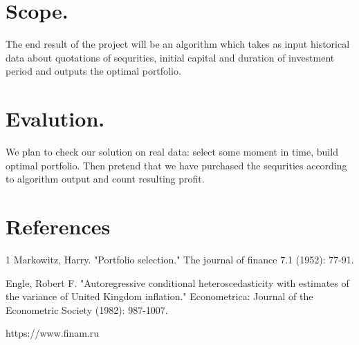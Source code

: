 \documentclass[a4paper, 12pt]{article}
\begin{document}
\section{Scope.}

The end result of the project will be an algorithm which takes as input historical data about 
quotations of sequrities, initial capital and duration of investment period and outputs the optimal portfolio.


\section{Evalution.}

We plan to check our solution on real data: select some moment in time, build optimal portfolio. Then pretend that we have
purchased the sequrities according to algorithm output and count resulting profit.


\section{References}
\def\refname{}
\begin{thebibliography}
{1} Markowitz, Harry. "Portfolio selection." The journal of finance 7.1 (1952): 77-91.


Engle, Robert F. "Autoregressive conditional heteroscedasticity with estimates of the variance of United Kingdom inflation." Econometrica: Journal of the Econometric Society (1982): 987-1007.

 {https://www.finam.ru}
\end{thebibliography}
\end{document}
